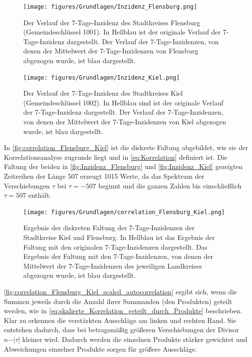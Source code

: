 \begin{figure}[H]
    \centering
    \texttt{[image: figures/Grundlagen/Inzidenz\_Flensburg.png]}
    \caption{Der Verlauf der 7-Tage-Inzidenz des Stadtkreises Flensburg (Gemeindeschlüssel 1001).
    In Hellblau ist der originale Verlauf der 7-Tage-Inzidenz dargestellt. Der Verlauf der 7-Tage-Inzidenzen, von denen der Mittelwert der 7-Tage-Inzidenzen von Flensburg abgezogen wurde, ist blau dargestellt.}
    \label{fig:Inzidenz_Flensburg}
\end{figure}
\begin{figure}[H]
    \centering
    \texttt{[image: figures/Grundlagen/Inzidenz\_Kiel.png]}
    \caption{Der Verlauf der 7-Tage-Inzidenz des Stadtkreises Kiel (Gemeindeschlüssel 1002).
    In Hellblau sind ist der originale Verlauf der 7-Tage-Inzidenz dargestellt. Der Verlauf der 7-Tage-Inzidenzen, von denen der Mittelwert der 7-Tage-Inzidenzen von Kiel abgezogen wurde, ist blau dargestellt.}
    \label{fig:Inzidenz_Kiel}
\end{figure}
In \autoref{fig:correlation_Flensburg_Kiel} ist die diskrete Faltung abgebildet, wie sie der Korrelationsanalyse zugrunde liegt und in \autoref{eq:Korrelation} definiert ist. Die Faltung der beiden in \autoref{fig:Inzidenz_Flensburg} und \autoref{fig:Inzidenz_Kiel} gezeigten Zeitreihen der Länge 507 erzeugt 1015 Werte, da das Spektrum der Verschiebungen $\tau$ bei $\tau=-507$ beginnt und die ganzen Zahlen bis einschließlich $\tau=507$ enthält.
\begin{figure}[H]
    \centering
    \texttt{[image: figures/Grundlagen/correlation\_Flensburg\_Kiel.png]}
    \caption{Ergebnis der diskreten Faltung der 7-Tage-Inzidenzen der Stadtkreise Kiel und Flensburg.
    In Hellblau ist das Ergebnis der Faltung mit den originalen 7-Tage-Inzidenzen dargestellt. Das Ergebnis der Faltung mit den 7-Tage-Inzidenzen, von denen der Mittelwert der 7-Tage-Inzidenzen des jeweiligen Landkreises abgezogen wurde, ist blau dargestellt.}
    \label{fig:correlation_Flensburg_Kiel}
\end{figure}
\autoref{fig:correlation_Flensburg_Kiel_scaled_autocorrelation} ergibt sich, wenn die Summen jeweils durch die Anzahl ihrer Summanden (den Produkten) geteilt werden, wie in \autoref{eq:skalierte_Korrelation_geteilt_durch_Produkte} beschrieben. Klar zu erkennen die verstärkten Ausschläge am linken und rechten Rand. Sie entstehen dadurch, dass bei betragsmäßig größeren Verschiebungen der Divisor $n-\vert\tau\vert$ kleiner wird. Dadurch werden die einzelnen Produkte stärker gewichtet und Abweichungen einzelner Produkte sorgen für größere Ausschläge.
